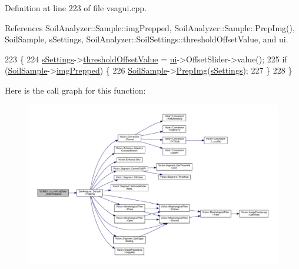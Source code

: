 Definition at line 223 of file vsagui.\+cpp.



References Soil\+Analyzer\+::\+Sample\+::img\+Prepped, Soil\+Analyzer\+::\+Sample\+::\+Prep\+Img(), Soil\+Sample, s\+Settings, Soil\+Analyzer\+::\+Soil\+Settings\+::threshold\+Offset\+Value, and ui.


\begin{DoxyCode}
223                                               \{
224   \hyperlink{class_v_s_a_g_u_i_a4a0358d00aa3cb520a9a1321962b0d4d}{sSettings}->\hyperlink{class_soil_analyzer_1_1_soil_settings_a48330eb812672b50a94483f264614e8f}{thresholdOffsetValue} = \hyperlink{class_v_s_a_g_u_i_a7a1d0cb3cf813ff9dce12f7f0ed6cd7a}{ui}->OffsetSlider->value();
225   \textcolor{keywordflow}{if} (\hyperlink{class_v_s_a_g_u_i_ac90517c9baea0a75455d43d5eb77d3e7}{SoilSample}->\hyperlink{class_soil_analyzer_1_1_sample_ab025a26f7276128a5a974cae15b51dfc}{imgPrepped}) \{
226     \hyperlink{class_v_s_a_g_u_i_ac90517c9baea0a75455d43d5eb77d3e7}{SoilSample}->\hyperlink{class_soil_analyzer_1_1_sample_a23050a1fff3e11e907657623756333b2}{PrepImg}(\hyperlink{class_v_s_a_g_u_i_a4a0358d00aa3cb520a9a1321962b0d4d}{sSettings});
227   \}
228 \}
\end{DoxyCode}


Here is the call graph for this function\+:\nopagebreak
\begin{figure}[H]
\begin{center}
\leavevmode
\includegraphics[width=350pt]{class_v_s_a_g_u_i_a161ef77cd94b239874ea35079aec9eb4_cgraph}
\end{center}
\end{figure}


\hypertarget{class_v_s_a_g_u_i_a8a5092f741e17c73b04850a6b30dda04}{}
